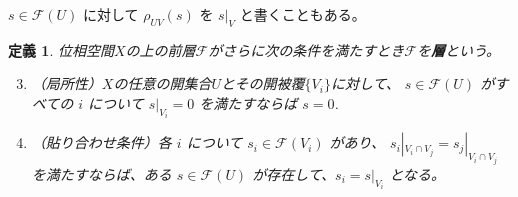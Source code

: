 \documentclass[uplatex]{jsreport}
\newtheorem{dfn}[thm]{定義}
\newcommand{\mcF}{\mathcal{F}}
\begin{document}
$s \in \mcF(U)$ に対して $\rho_{UV}(s)$ を $s|_V$ と書くこともある。

\begin{dfn}
    位相空間$X$の上の前層$\mcF$がさらに次の条件を満たすとき$\mcF$を\textbf{層}という。
    \begin{enumerate}
        \setcounter{enumi}{2}
        \item （局所性）$X$の任意の開集合$U$とその開被覆$\{V_i\}$に対して、
              $s \in \mcF(U)$ がすべての $i$ について $s|_{V_i} = 0$ を満たすならば $s = 0$.
        \item （貼り合わせ条件）各 $i$ について $s_i \in \mcF(V_i)$ があり、
              $s_i|_{V_i \cap V_j} = s_j|_{V_i \cap V_j}$　を満たすならば、ある $s \in \mcF(U)$
              が存在して、$s_i = s|_{V_i}$ となる。
    \end{enumerate}
\end{dfn}
\end{document}
